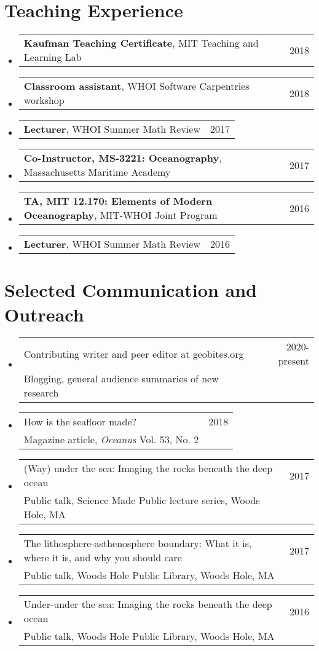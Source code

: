 \documentclass[letterpaper,11pt]{article}
\makeatletter
\newcommand{\resumeSmallThing}[3]{
  \vspace{-2pt}\item
    \begin{tabular*}{0.97\textwidth}[t]{l@{\extracolsep{\fill}}r}
      \textbf{#1}, {#2} & #3\\
    \end{tabular*}\vspace{-14pt}
}
\newcommand{\resumeComms}[4]{
  \vspace{-2pt}\item
    \begin{tabular*}{0.97\textwidth}[t]{l@{\extracolsep{\fill}}r}
      #1 & #2 \\
      \small#3, \small#4 \\
    \end{tabular*}\vspace{-7pt}
}
\newcommand{\resumeSubHeadingListStart}{\begin{itemize}[leftmargin=0.15in, label={}]}
\newcommand{\resumeSubHeadingListEnd}{\end{itemize}}
\makeatother
\begin{document}
\section{Teaching Experience}
  \resumeSubHeadingListStart
    \resumeSmallThing
      {Kaufman Teaching Certificate}{MIT Teaching and Learning Lab}{2018}
    \resumeSmallThing
      {Classroom assistant}{WHOI Software Carpentries workshop}{2018}
    \resumeSmallThing
      {Lecturer}{WHOI Summer Math Review}{2017}
    \resumeSmallThing
      {Co-Instructor, MS-3221: Oceanography}{Massachusetts Maritime Academy}{2017}
    \resumeSmallThing
      {TA, MIT 12.170: Elements of Modern Oceanography}{MIT-WHOI Joint Program}{2016}
    \resumeSmallThing
      {Lecturer}{WHOI Summer Math Review}{2016}
  \resumeSubHeadingListEnd


\section{Selected Communication and Outreach}
    \resumeSubHeadingListStart
    \resumeComms
    {Contributing writer and peer editor at geobites.org}{2020-present}
    {Blogging}{general audience summaries of new research}
    \resumeComms
    {How is the seafloor made?}{2018}
    {Magazine article}{\textit{Oceanus} Vol. 53, No. 2}
    \resumeComms
    {(Way) under the sea: Imaging the rocks beneath the deep ocean}{2017}
    {Public talk}{Science Made Public lecture series, Woods Hole, MA}
    \resumeComms
    {The lithosphere-asthenosphere boundary: What it is, where it is, and why you should care}{2017}
    {Public talk}{Woods Hole Public Library, Woods Hole, MA}
    \resumeComms
    {Under-under the sea: Imaging the rocks beneath the deep ocean}{2016}
    {Public talk}{Woods Hole Public Library, Woods Hole, MA}
    \resumeSubHeadingListEnd


\end{document}
